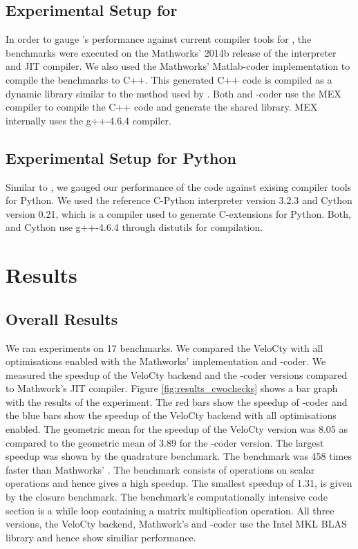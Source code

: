 \subsection{Experimental Setup for \matlab}
 In order to gauge \velocty's performance against current compiler tools for \matlab, the \matlab benchmarks were executed on the Mathworks' 2014b release of the \matlab interpreter and JIT compiler. We also used the Mathworks' Matlab-coder implementation to compile the benchmarks to C++. This generated C++ code is compiled as  a dynamic library similar to the method used by \velocty. Both \velocty and \matlab-coder use the MEX compiler to compile the C++ code and generate the shared library. MEX internally uses the g++-4.6.4 compiler. 
\subsection{Experimental Setup for Python}
 Similar to \matlab, we gauged our performance of the \velocty code against exising compiler tools for Python. We used the reference C-Python interpreter version 3.2.3  and Cython\cite{cython} version 0.21, which is a compiler used to generate C-extensions for Python. Both, \velocty and Cython use g++-4.6.4 through distutils for compilation. 

\section{\matlab Results}
\subsection{Overall Results}
We ran experiments on 17 \matlab benchmarks. We compared the VeloCty with all optimisations enabled  with the Mathworks' \matlab implementation and \matlab-coder. We measured the speedup of the VeloCty backend and the \matlab-coder versions compared to Mathwork's \matlab JIT compiler. Figure \ref{fig:results_cwochecks} shows a bar graph with the results of the experiment. The red bars show the speedup of \matlab-coder and the blue bars show the speedup of the VeloCty backend with all optimisations enabled. The geometric mean for the speedup of the VeloCty version was 8.05 as compared to the geometric mean of 3.89 for the \matlab-coder version. The largest speedup was shown by the quadrature benchmark. The benchmark was 458 times faster than Mathworks' \matlab. The benchmark consists of operations on scalar operations and hence gives a high speedup. The smallest speedup of 1.31, is given by the closure benchmark. The benchmark's computationally intensive code section is a while loop containing a matrix multiplication operation. All three versions, the VeloCty backend, Mathwork's \matlab and \matlab-coder use the Intel MKL BLAS library and hence show similiar performance. 

